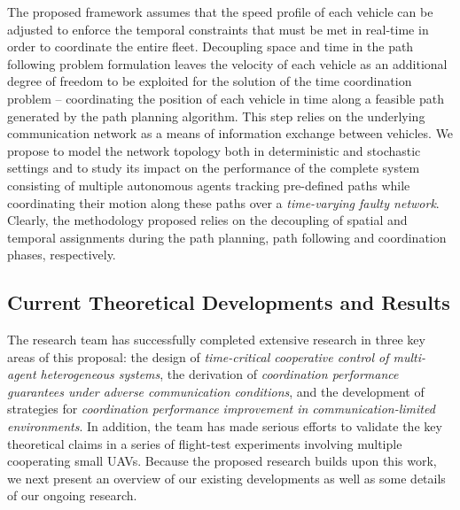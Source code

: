 \documentclass[letter,onecolumn,12pt]{aiaa-tc}
\newcommand{\1}{1_n}
\begin{document}
The proposed framework assumes that the speed profile of each vehicle can be adjusted to enforce the temporal constraints that must be met in real-time in order to coordinate the entire fleet. Decoupling space and time in the path following problem formulation leaves the velocity of each  vehicle as an additional  degree of freedom to be exploited for the solution of the time coordination problem -- coordinating the position of each vehicle in time along a feasible path generated by the path planning algorithm.  This step relies on the underlying communication network as a means of information exchange between vehicles. We propose to model the network topology both in deterministic and stochastic settings and to study its impact on the performance of the complete system consisting of multiple autonomous agents tracking pre-defined paths while coordinating their motion along these paths over a \emph{ time-varying faulty network}. Clearly, the methodology proposed relies on the decoupling of spatial and temporal assignments during the path planning, path following and coordination phases, respectively.

\subsection{Current Theoretical Developments and Results}
\label{subsec:current_develop}

The research team has successfully completed extensive research in three key areas of this proposal: the design of \emph{time-critical cooperative control of multi-agent heterogeneous systems}, the derivation of \emph{coordination performance guarantees under adverse communication conditions}, and the development of strategies for \emph{coordination performance improvement in communication-limited environments}. In addition, the team has made serious efforts to validate the key theoretical claims in a series of flight-test experiments involving multiple cooperating small UAVs. Because the proposed research builds upon this work, we next present an overview of our existing developments as well as some details of our ongoing research. %

\end{document}
